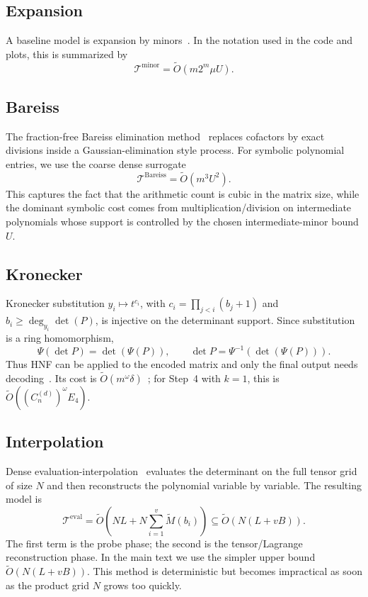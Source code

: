 \subsection{Expansion}
A baseline model is expansion by minors~\cite{GentlemanJohnson1976,HorowitzSahni1975}. In the notation used in the code and plots, this is summarized by
\[
\mathcal{T}^{\mathrm{minor}} = \widetilde{O}(m2^m\mu U).
\]


\subsection{Bareiss}
The fraction-free Bareiss elimination method~\cite{Bareiss1968} replaces cofactors by exact divisions inside a Gaussian-elimination style process. For symbolic polynomial entries, we use the coarse dense surrogate
\[
\mathcal{T}^{\mathrm{Bareiss}} = \widetilde{O}(m^3U^2).
\]
This captures the fact that the arithmetic count is cubic in the matrix size, while the dominant symbolic cost comes from multiplication/division on intermediate polynomials whose support is controlled by the chosen intermediate-minor bound $U$.

\subsection{Kronecker}
Kronecker substitution $y_i\mapsto t^{c_i}$, with $c_i=\prod_{j<i}(b_j+1)$ and $b_i\ge\deg_{y_i}\det(P)$, is injective on the determinant support. Since substitution is a ring homomorphism,
\[
 \Psi(\det P)=\det(\Psi(P)),\qquad
 \det P=\Psi^{-1}(\det(\Psi(P))).
\]
Thus HNF can be applied to the encoded matrix and only the final output needs decoding~\cite[Theorems~5 and~7]{Li2007symbolic}. Its cost is $\widetilde O(m^\omega\delta)$~\cite{DBLP:journals/jc/LabahnNZ17}; for Step~4 with $k=1$, this is $\widetilde O((C_n^{(d)})^\omega E_4)$.

\subsection{Interpolation}
Dense evaluation-interpolation~\cite{HorowitzSahni1975} evaluates the determinant on the full tensor grid of size $N$ and then reconstructs the polynomial variable by variable. The resulting model is
\[
\mathcal{T}^{\mathrm{eval}} = \widetilde{O}\!\left(NL + N\sum_{i=1}^{v}\widetilde{M}(b_i)\right)
\subseteq \widetilde{O}\!\left(N(L+vB)\right).
\]
The first term is the probe phase; the second is the tensor/Lagrange reconstruction phase. In the main text we use the simpler upper bound $\widetilde{O}(N(L+vB))$. This method is deterministic but becomes impractical as soon as the product grid $N$ grows too quickly.

